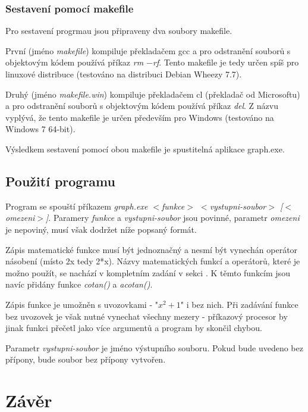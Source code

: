 \documentclass 	[a4paper,12pt]	{article}
\begin{document}
\subsubsection{Sestavení pomocí makefile}
Pro sestavení progrmau jsou připraveny dva soubory makefile.  

První (jméno \emph{makefile}) kompiluje překladačem gcc a pro odstranění souborů s objektovým kódem používá příkaz \emph{rm $-$rf}. Tento makefile je tedy určen spíš pro linuxové distribuce (testováno na distribuci Debian Wheezy 7.7).

Druhý (jméno \emph{makefile.win}) kompiluje překladačem cl (překladač od Microsoftu) a pro odstranění souborů s objektovým kódem používá příkaz \emph{del}. Z názvu vyplývá, že tento makefile je určen především pro Windows (testováno na Windows 7 64-bit). 

Výsledkem sestavení pomocí obou makefile je spustitelná aplikace graph.exe.

\subsection{Použití programu}
Program se spouští příkazem \emph{graph.exe $<$funkce$>$ $<$vystupni-soubor$>$ [$<$omezeni$>$]}. Paramery \emph{funkce} a \emph{vystupni-soubor} jsou povinné, parametr \emph{omezeni} je nepoviný, musí však dodržet níže popsaný formát.

Zápis matematické funkce musí být jednoznačný a nesmí být vynechán operátor násobení (místo 2x tedy 2*x). Názvy matematických funkcí a operátorů, které je možno použít, se nachází v kompletním zadání v sekci . K těmto funkcím jsou navíc přidány funkce \emph{cotan()} a \emph{acotan()}. 

Zápis funkce je umožněn s uvozovkami - "$x^2 + 1$" i bez nich. Při zadávání funkce bez uvozovek je však nutné vynechat všechny mezery - příkazový procesor by jinak funkci přečetl jako více argumentů a program by skončil chybou.

Parametr \emph{vystupni-soubor} je jméno výstupního souboru. Pokud bude uvedeno bez přípony, bude soubor bez přípony vytvořen. 

\section{Závěr}
\end{document}
